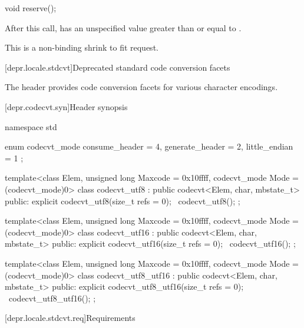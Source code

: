%
\begin{itemdecl}
void reserve();
\end{itemdecl}

\begin{itemdescr}
\pnum
\effects
After this call,  has an unspecified value
greater than or equal to .
\begin{note}
This is a non-binding shrink to fit request.
\end{note}
\end{itemdescr}

[depr.locale.stdcvt]{Deprecated standard code conversion facets}

\pnum
The header  provides
code conversion facets for various character encodings.

[depr.codecvt.syn]{Header  synopsis}

%
%
%
%
\begin{codeblock}
namespace std {
  enum codecvt_mode {
    consume_header = 4,
    generate_header = 2,
    little_endian = 1
  };

  template<class Elem, unsigned long Maxcode = 0x10ffff, codecvt_mode Mode = (codecvt_mode)0>
    class codecvt_utf8 : public codecvt<Elem, char, mbstate_t> {
    public:
      explicit codecvt_utf8(size_t refs = 0);
      ~codecvt_utf8();
    };

  template<class Elem, unsigned long Maxcode = 0x10ffff, codecvt_mode Mode = (codecvt_mode)0>
    class codecvt_utf16 : public codecvt<Elem, char, mbstate_t> {
    public:
      explicit codecvt_utf16(size_t refs = 0);
      ~codecvt_utf16();
    };

  template<class Elem, unsigned long Maxcode = 0x10ffff, codecvt_mode Mode = (codecvt_mode)0>
    class codecvt_utf8_utf16 : public codecvt<Elem, char, mbstate_t> {
    public:
      explicit codecvt_utf8_utf16(size_t refs = 0);
      ~codecvt_utf8_utf16();
    };
}
\end{codeblock}

[depr.locale.stdcvt.req]{Requirements}


